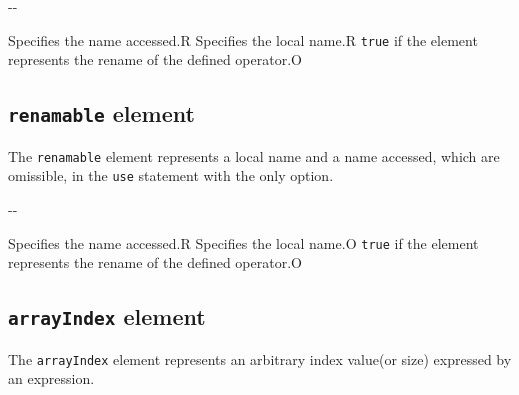 \begin{XcodeMLChildElements}
\XcodeMLElementDef{-}
{-}{-}
\end{XcodeMLChildElements}

\begin{XcodeMLAttributes}
{Specifies the name accessed.}{R}
{Specifies the local name.}{R}
{{\tt true} if the element represents the rename of the defined operator.}{O}
\end{XcodeMLAttributes}


\subsection{ {\tt renamable} element}

The {\tt renamable} element represents a local name and a name accessed, which are omissible, in the {\tt use} statement with the only option.


\begin{XcodeMLChildElements}
\XcodeMLElementDef{-}
{-}{-}
\end{XcodeMLChildElements}

\begin{XcodeMLAttributes}
{Specifies the name accessed.}{R}
{Specifies the local name.}{O}
{{\tt true} if the element represents the rename of the defined operator.}{O}
\end{XcodeMLAttributes}


\subsection{ {\tt arrayIndex} element}

The {\tt arrayIndex} element represents an arbitrary index value(or size) expressed by an expression.


